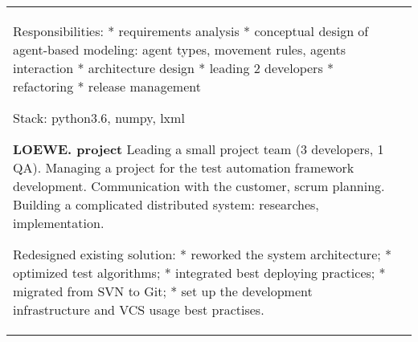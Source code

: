 \documentclass[a4paper,10pt]{article}
\begin{document}
\begin{tabularx}{\textwidth}{lX}
{                                    Responsibilities:\newline
                                    * requirements analysis\newline
                                    * conceptual design of agent-based modeling: agent types, movement rules, agents interaction\newline
                                    * architecture design\newline
                                    * leading 2 developers\newline
                                    * refactoring\newline
                                    * release management\newline
                                    
                                    Stack: python3.6, numpy, lxml\newline\newline
                                    
                                    \textbf{LOEWE. project}\newline
                                    Leading a small project team (3 developers, 1 QA).\newline
                                    Managing a project for the test automation framework development.\newline
                                    Communication with the customer, scrum planning.\newline
                                    Building a complicated distributed system: researches, implementation.\newline
                                    
                                    Redesigned existing solution:\newline
                                    * reworked the system architecture;\newline
                                    * optimized test algorithms;\newline
                                    * integrated best deploying practices;\newline
                                    * migrated from SVN to Git;\newline
                                    * set up the development infrastructure and VCS usage best practises.\newline
                                    
}
\end{tabularx}
\end{document}
